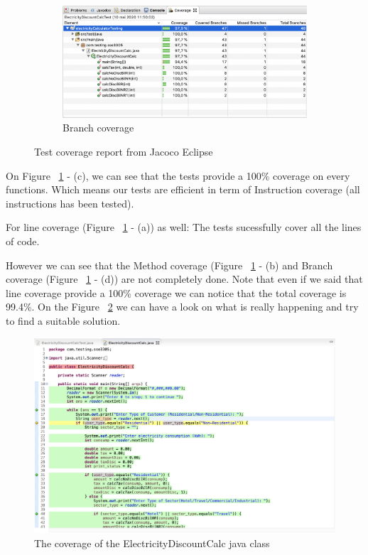 \documentclass{article}
\begin{document}
\begin{figure}[h!]
\begin{subfigure}[b]{0.4\linewidth}
			\includegraphics[width=\linewidth]{coverage/branch_coverage.png}
			\caption{Branch coverage}
		\end{subfigure}
		\caption{Test coverage report from Jacoco Eclipse}
		\label{fig:coveragereport}
	\end{figure}

    On Figure ~\ref{fig:coveragereport} - (c), we can see that the tests provide a 100\% coverage on every functions. Which means our
    tests are efficient in term of Instruction coverage (all instructions has been tested). 
    
    For line coverage (Figure ~\ref{fig:coveragereport} - (a)) as well: The tests sucessfully
    cover all the lines of code.

    However we can see that the Method coverage (Figure ~\ref{fig:coveragereport} - (b) and Branch coverage (Figure ~\ref{fig:coveragereport} - (d))
    are not completely done.  Note that even if we said that line coverage provide a 100\% coverage we can notice that the total coverage is 99.4\%.
    On the Figure ~\ref{fig:instructioncoverageclass} we can have a look on what is really happening and try to find a suitable solution.
   
    \newpage

    \begin{figure}[t!]
		\includegraphics[width=0.8\linewidth, center]{coverage/instruction_coverage_class.png}
		\caption{The coverage of the ElectricityDiscountCalc java class}
		\label{fig:instructioncoverageclass}
	\end{figure}
\end{document}
